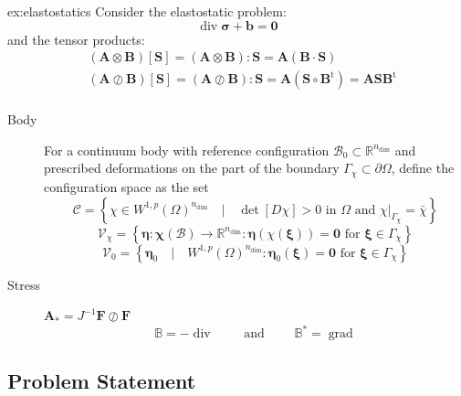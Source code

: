 \begin{exmpl}[Elastostatics.]{ex:elastostatics}
Consider the elastostatic problem:
$$
\operatorname{div}\bm{\sigma} + \bm{b} = \bm{0}
$$
and the tensor products:
$$
\begin{aligned}
& (\mathbf{A} \otimes \mathbf{B})[ \mathbf{S}]=(\mathbf{A} \otimes \mathbf{B}): \mathbf{S} = \mathbf{A} (\mathbf{B}\cdot \mathbf{S}) \\
& (\mathbf{A} \oslash \mathbf{B})[ \mathbf{S}]=(\mathbf{A} \oslash \mathbf{B}): \mathbf{S}=\mathbf{A} (\mathbf{S} \circ \mathbf{B}^{\mathrm{t}})=\mathbf{A} \mathbf{S} \mathbf{B}^{\mathrm{t}} \\
\end{aligned}
$$
\begin{description}
    \item[Body] 
    For a continuum body with reference configuration 
    $\mathcal{B}_0 \subset \mathbb{R}^{n_{\mathrm{dim}}}$ 
    and prescribed deformations on
    the part of the boundary $\Gamma_{\chi} \subset \partial \Omega$, define the configuration space as the set
    $$
    \mathscr{C}=\left\{\chi \in W^{1, p}(\Omega)^{n_{\mathrm{dim}}}
    \quad|\quad
    \det[D \chi]>0 \text{ in }\Omega\text{ and }\left.\chi\right|_{\Gamma_{\chi}}=\bar{\chi}\right\}
    $$
    $$
    \mathcal{V}_{\chi}=\left\{\bm{\eta}: \bm{\chi}(\mathscr{B}) \rightarrow \mathbb{R}^{n_{\mathrm{dim}}}: \bm{\eta}(\chi (\bm{\xi}))
    =\bm{0}\text{ for }\bm{\xi} \in \Gamma_{\chi}\right\}
    $$
    $$
    \mathcal{V}_0 =
    \left\{\bm{\eta}_0 \quad | \quad 
    W^{1, p}(\Omega)^{n_{\mathrm{dim}}}: \bm{\eta}_0(\bm{\xi})=\bm{0} \text{ for } \bm{\xi} \in \Gamma_{\chi}\right\}
    $$
    
    \item[Stress] 
    $\bm{A}_{*} = J^{-1}\bm{F}\oslash\bm{F}$
    $$
    \mathbb{B} = -\operatorname{div}
    \qquad\text{ and }\qquad
    \mathbb{B}^* = \operatorname{grad}
    $$
\end{description}
\end{exmpl}


\iffalse
\hypertarget{sec:statement}{%
\subsection{Problem Statement}\label{sec:statement}}

